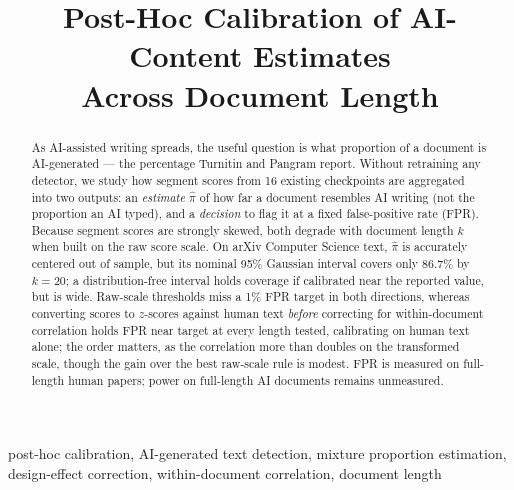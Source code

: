 \documentclass[10pt,conference,a4paper]{IEEEtran}
\begin{document}
\title{Post-Hoc Calibration of AI-Content Estimates\\Across Document Length}

\author{
}


\maketitle

\begin{abstract}
As AI-assisted writing spreads, the useful question is what proportion of a document is
AI-generated --- the percentage Turnitin and Pangram report. Without retraining any
detector, we study how segment scores from 16 existing checkpoints are aggregated into
two outputs: an \emph{estimate} $\hat{\pi}$ of how far a document resembles AI writing
(not the proportion an AI typed), and a \emph{decision} to flag it at a fixed
false-positive rate (FPR). Because segment scores are strongly skewed, both degrade with
document length $k$ when built on the raw score scale. On arXiv Computer Science text,
$\hat{\pi}$ is accurately centered out of sample, but its nominal 95\% Gaussian interval
covers only 86.7\% by $k{=}20$; a distribution-free interval holds coverage if
calibrated near the reported value, but is wide.
Raw-scale thresholds miss a 1\% FPR target in both directions, whereas converting scores
to $z$-scores against human text \emph{before} correcting for within-document
correlation holds FPR near target at every length tested, calibrating on human text
alone; the order matters, as the correlation more than doubles on the transformed
scale, though the gain over the best raw-scale rule is modest. FPR is measured on
full-length human papers; power on full-length AI documents remains unmeasured.
\end{abstract}

\begin{IEEEkeywords}
post-hoc calibration, AI-generated text detection, mixture proportion estimation,
design-effect correction, within-document correlation, document length
\end{IEEEkeywords}
\end{document}
